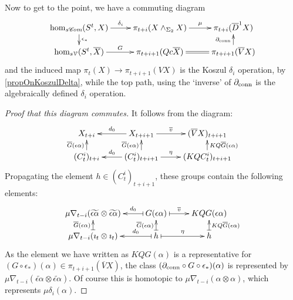 \documentclass[11pt]{amsart}
\theoremstyle{plain}
\theoremstyle{definition}
\renewcommand{\to}{\longrightarrow}
\newcommand{\scrC}{\mathscr{C}}
\newcommand{\calV}{\mathcal{V}}
\theoremstyle{plain}
\newcommand{\Nabla}{\nabla}
\newcommand{\algcat}{{\scrC\!\textit{om}}}%
\begin{document}
\begin{Operations on the Bousfield-Kan spectral sequence}
Now to get to the point, we have a commuting diagram
\[\xymatrix@R=4mm{
\hom_{s\algcat}(S^t,X)\ar[r]^-{\delta_i}
\ar[d]^-{\epsilon_*}
&%
\pi_{t+i}(X\wedge_{\Sigma_2} X)\ar[r]^-{\mu}
&
\pi_{t+i}(\overline{D}^1X)
\\%
\hom_{s\calV}(S^t,\overline{X})\ar[r]^-{G}&%
\pi_{t+i+1}(Qc\overline{X})\ar@{=}[r]
&
\pi_{t+i+1}(\overline{V}X)
\ar[u]^-{\partial_\textup{conn}}
}\]
and the induced map $\pi_t(X)\to \pi_{t+i+1}(VX)$ is the Koszul $\delta_i$ operation, by \ref{propOnKoszulDelta}, while the top path, using the `inverse' of $\partial_\textup{conn}$ is the algebraically defined $\delta_i$ operation.
\begin{proof}[Proof that this diagram commutes]
It follows from the diagram:
\[\xymatrix@R=4mm{
X_{t+i}&%
X_{t+i+1}\ar[l]_-{d_0}
\ar[r]^-{\overline{v}}
&%
(\overline{V}X)_{t+i+1}\\%
(C_t^i)_{t+i}\ar[u]^-{\overline{G}(\epsilon\alpha)}
&%
(C_t^i)_{t+i+1}\ar[u]^-{\overline{G}(\epsilon\alpha)}\ar[r]^-{\eta}
\ar[l]_-{d_0}
&%
(KQC_t^i)_{t+i+1}\ar[u]_-{KQ\overline{G}(\epsilon\alpha)}%
}\]
Propagating the element $h\in (C_t^i)_{t+i+1}$, these groups contain the following elements:
\[\xymatrix@R=4mm{
\mu\Nabla_{t-i}(\widetilde{\epsilon\alpha}\otimes \widetilde{\epsilon\alpha})&%
G(\epsilon\alpha)\ar@{|->}[l]_-{d_0}
\ar@{|->}[r]^-{\overline{v}}
&%
KQG(\epsilon\alpha)\\%
\mu\Nabla_{t-i}(\imath_t\otimes\imath_t)\ar@{|->}[u]^-{\overline{G}(\epsilon\alpha)}
&%
h\ar@{|->}[u]^-{\overline{G}(\epsilon\alpha)}\ar@{|->}[r]^-{\eta}
\ar@{|->}[l]_-{d_0}
&%
h\ar@{|->}[u]_-{KQ\overline{G}(\epsilon\alpha)}%
}\]
As the element we have written as $KQG(\alpha)$ is a representative for $(G\circ\epsilon_*)(\alpha)\in\pi_{t+i+1}(\overline{V}X)$, the class $(\partial_\textup{conn}\circ G\circ\epsilon_*)(\alpha)$ is represented by $\mu\Nabla_{t-i}(\widetilde{\epsilon\alpha}\otimes \widetilde{\epsilon\alpha})$. Of course this is homotopic to $\mu\Nabla_{t-i}(\alpha\otimes \alpha)$, which represents $\mu\delta_i(\alpha)$.
\end{proof}















\end{Operations on the Bousfield-Kan spectral sequence}
\end{document}
